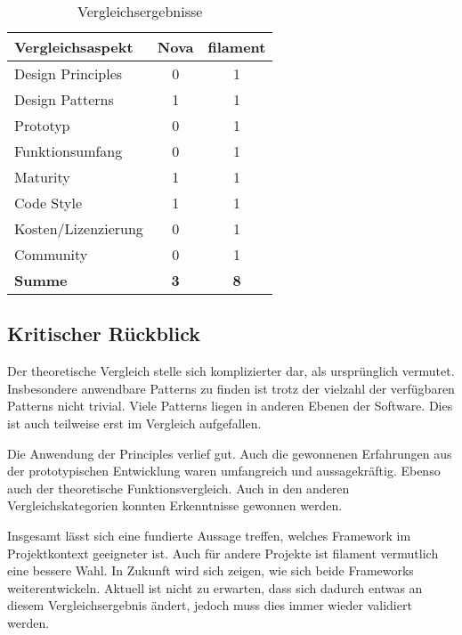 \begin{table}[h!]
    \centering
    \caption{Vergleichsergebnisse}
    \label{tab:vergleichsergebnisse}
    \begin{tabular}{|l|c|c|}
        \hline
        \textbf{Vergleichsaspekt} & \textbf{Nova} & \textbf{filament} \\ \hline
        Design Principles         & 0             & 1                 \\ \hline
        Design Patterns           & 1             & 1                 \\ \hline
        Prototyp                  & 0             & 1                 \\ \hline
        Funktionsumfang           & 0             & 1                 \\ \hline
        Maturity                  & 1             & 1                 \\ \hline
        Code Style                & 1             & 1                 \\ \hline
        Kosten/Lizenzierung       & 0             & 1                 \\ \hline
        Community                 & 0             & 1                 \\ \hline
        \textbf{Summe}            & \textbf{3}    & \textbf{8}        \\ \hline
    \end{tabular}
\end{table}

\newpage

\subsection{Kritischer Rückblick}
Der theoretische Vergleich stelle sich komplizierter dar, als ursprünglich vermutet.
Insbesondere anwendbare Patterns zu finden ist trotz der vielzahl der verfügbaren Patterns nicht trivial.
Viele Patterns liegen in anderen Ebenen der Software.
Dies ist auch teilweise erst im Vergleich aufgefallen.

Die Anwendung der Principles verlief gut.
Auch die gewonnenen Erfahrungen aus der prototypischen Entwicklung waren umfangreich und aussagekräftig.
Ebenso auch der theoretische Funktionsvergleich.
Auch in den anderen Vergleichskategorien konnten Erkenntnisse gewonnen werden.

Insgesamt lässt sich eine fundierte Aussage treffen, welches Framework im Projektkontext geeigneter ist.
Auch für andere Projekte ist filament vermutlich eine bessere Wahl.
In Zukunft wird sich zeigen, wie sich beide Frameworks weiterentwickeln.
Aktuell ist nicht zu erwarten, dass sich dadurch entwas an diesem Vergleichsergebnis ändert, jedoch muss dies immer wieder validiert werden.
